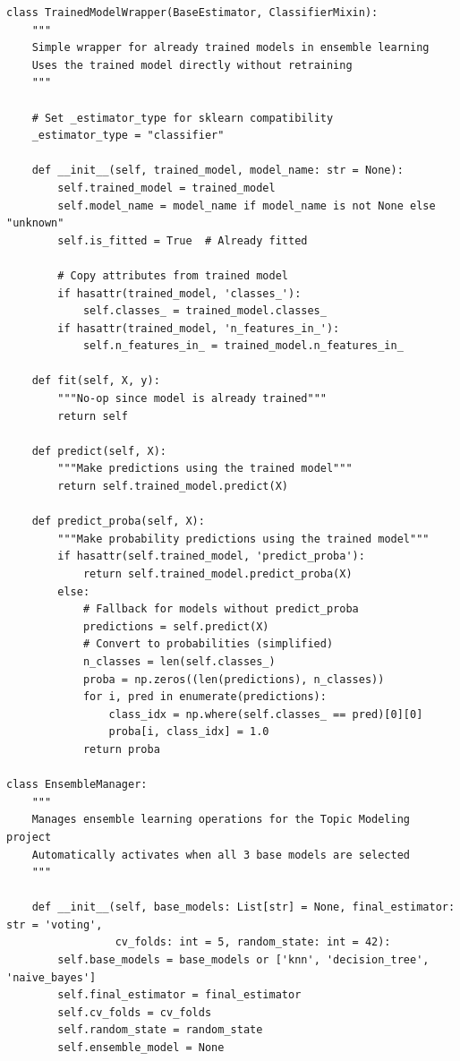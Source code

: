 \begin{verbatim}
class TrainedModelWrapper(BaseEstimator, ClassifierMixin):
    """
    Simple wrapper for already trained models in ensemble learning
    Uses the trained model directly without retraining
    """
    
    # Set _estimator_type for sklearn compatibility
    _estimator_type = "classifier"
    
    def __init__(self, trained_model, model_name: str = None):
        self.trained_model = trained_model
        self.model_name = model_name if model_name is not None else "unknown"
        self.is_fitted = True  # Already fitted
        
        # Copy attributes from trained model
        if hasattr(trained_model, 'classes_'):
            self.classes_ = trained_model.classes_
        if hasattr(trained_model, 'n_features_in_'):
            self.n_features_in_ = trained_model.n_features_in_
    
    def fit(self, X, y):
        """No-op since model is already trained"""
        return self
        
    def predict(self, X):
        """Make predictions using the trained model"""
        return self.trained_model.predict(X)
        
    def predict_proba(self, X):
        """Make probability predictions using the trained model"""
        if hasattr(self.trained_model, 'predict_proba'):
            return self.trained_model.predict_proba(X)
        else:
            # Fallback for models without predict_proba
            predictions = self.predict(X)
            # Convert to probabilities (simplified)
            n_classes = len(self.classes_)
            proba = np.zeros((len(predictions), n_classes))
            for i, pred in enumerate(predictions):
                class_idx = np.where(self.classes_ == pred)[0][0]
                proba[i, class_idx] = 1.0
            return proba

class EnsembleManager:
    """
    Manages ensemble learning operations for the Topic Modeling project
    Automatically activates when all 3 base models are selected
    """
    
    def __init__(self, base_models: List[str] = None, final_estimator: str = 'voting', 
                 cv_folds: int = 5, random_state: int = 42):
        self.base_models = base_models or ['knn', 'decision_tree', 'naive_bayes']
        self.final_estimator = final_estimator
        self.cv_folds = cv_folds
        self.random_state = random_state
        self.ensemble_model = None
        

\end{verbatim}
